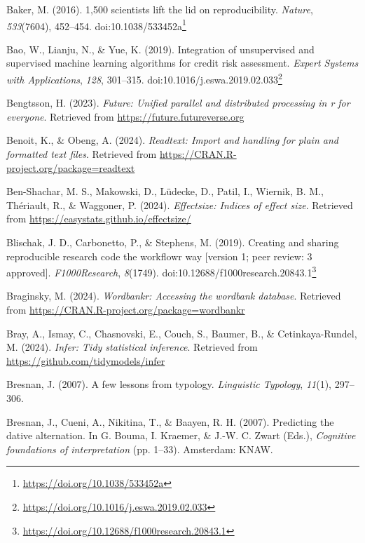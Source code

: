 \documentclass[
  letterpaper,
]{book}
\newlength{\cslhangindent}
\newenvironment{CSLReferences}[2] %
 {\begin{list}{}{%
  \setlength{\itemindent}{0pt}
  \setlength{\leftmargin}{0pt}
  \setlength{\parsep}{0pt}
  \ifodd #1
   \setlength{\leftmargin}{\cslhangindent}
   \setlength{\itemindent}{-1\cslhangindent}
  \fi
  \setlength{\itemsep}{#2\baselineskip}}}
 {\end{list}}
\theoremstyle{definition}
\theoremstyle{remark}
\DeclareRobustCommand{\href}[2]{#2\footnote{\url{#1}}}
\begin{document}
\begin{CSLReferences}{1}{0}
Baker, M. (2016). 1,500 scientists lift the lid on reproducibility.
\emph{Nature}, \emph{533}(7604), 452--454.
doi:\href{https://doi.org/10.1038/533452a}{10.1038/533452a}

Bao, W., Lianju, N., \& Yue, K. (2019). Integration of unsupervised and
supervised machine learning algorithms for credit risk assessment.
\emph{Expert Systems with Applications}, \emph{128}, 301--315.
doi:\href{https://doi.org/10.1016/j.eswa.2019.02.033}{10.1016/j.eswa.2019.02.033}

Bengtsson, H. (2023). \emph{Future: Unified parallel and distributed
processing in r for everyone}. Retrieved from
\url{https://future.futureverse.org}

Benoit, K., \& Obeng, A. (2024). \emph{Readtext: Import and handling for
plain and formatted text files}. Retrieved from
\url{https://CRAN.R-project.org/package=readtext}

Ben-Shachar, M. S., Makowski, D., Lüdecke, D., Patil, I., Wiernik, B.
M., Thériault, R., \& Waggoner, P. (2024). \emph{Effectsize: Indices of
effect size}. Retrieved from
\url{https://easystats.github.io/effectsize/}

Blischak, J. D., Carbonetto, P., \& Stephens, M. (2019). Creating and
sharing reproducible research code the workflowr way {[}version 1; peer
review: 3 approved{]}. \emph{F1000Research}, \emph{8}(1749).
doi:\href{https://doi.org/10.12688/f1000research.20843.1}{10.12688/f1000research.20843.1}

Braginsky, M. (2024). \emph{Wordbankr: Accessing the wordbank database}.
Retrieved from \url{https://CRAN.R-project.org/package=wordbankr}

Bray, A., Ismay, C., Chasnovski, E., Couch, S., Baumer, B., \&
Cetinkaya-Rundel, M. (2024). \emph{Infer: Tidy statistical inference}.
Retrieved from \url{https://github.com/tidymodels/infer}

Bresnan, J. (2007). A few lessons from typology. \emph{Linguistic
Typology}, \emph{11}(1), 297--306.

Bresnan, J., Cueni, A., Nikitina, T., \& Baayen, R. H. (2007).
Predicting the dative alternation. In G. Bouma, I. Kraemer, \& J.-W. C.
Zwart (Eds.), \emph{Cognitive foundations of interpretation} (pp.
1--33). Amsterdam: KNAW.


\end{CSLReferences}
\end{document}
